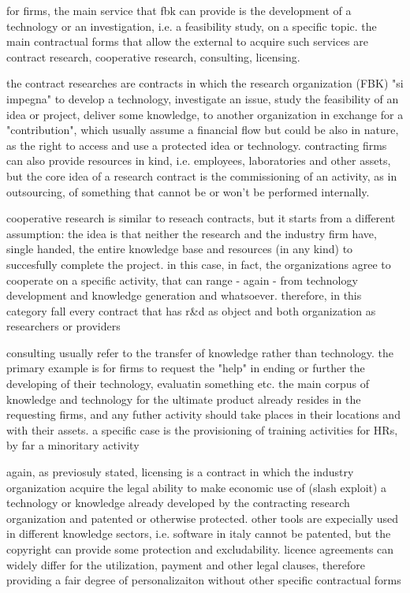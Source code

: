 for firms, the main service that fbk can provide is the development of a technology or an investigation, i.e. a feasibility study, on a specific topic. the main contractual forms that allow the external to acquire such services are contract research, cooperative research, consulting, licensing. 

the contract researches are contracts in which the research organization (FBK) "si impegna" to develop a technology, investigate an issue, study the feasibility of an idea or project, deliver some knowledge, to another organization in exchange for a "contribution", which usually assume a financial flow but could be also in nature, as the right to access and use a protected idea or technology. contracting firms can also provide resources in kind, i.e. employees, laboratories and other assets, but the core idea of a research contract is the commissioning of an activity, as in outsourcing, of something that cannot be or won't be performed internally.

cooperative research is similar to reseach contracts, but it starts from a different assumption: the idea is that neither the research and the industry firm have, single handed, the entire knowledge base and resources (in any kind) to succesfully complete the project. in this case, in fact, the organizations agree to cooperate on a specific activity, that can range - again - from technology development and knowledge generation and whatsoever. therefore, in this category fall every contract that has r\&d as object and both organization as researchers or providers

consulting usually refer to the transfer of knowledge rather than technology. the primary example is for firms to request the "help" in ending or further the developing of their technology, evaluatin something etc. the main corpus of knowledge and technology for the ultimate product already resides in the requesting firms, and any futher activity should take places in their locations and with their assets. a specific case is the provisioning of training activities for HRs, by far a minoritary activity

again, as previosuly stated, licensing is a contract in which the industry organization acquire the legal ability to make economic use of (slash exploit) a technology or knowledge already developed by the contracting research organization and patented or otherwise protected. other tools are expecially used in different knowledge sectors, i.e. software in italy cannot be patented, but the copyright can provide some protection and excludability. licence agreements can widely differ for the utilization, payment and other legal clauses, therefore providing a fair degree of personalizaiton without other specific contractual forms

